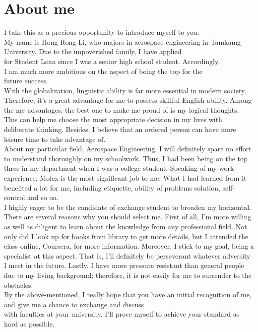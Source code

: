 \documentclass[a4paper,12pt,final]{memoir}
\begin{document}
\clearpage
\framebreak
\framebreak

\section{About me}
\raggedright
\hspace*{5mm}I take this as a precious opportunity to introduce myself to you.\\My name is Hong Rong Li, who majors in aerospace engineering in Tamkamg University. Due to the impoverished family, I have applied\\for Student Loan since I was a senior high school student. Accordingly,\\I am much more ambitious on the aspect of being the top for the\\future success.
\\
\hspace*{5mm}With the globalization, linguistic ability is far more essential in modern society. Therefore, it’s a great advantage for me to possess skillful English ability. Among the my advantages, the best one to make me proud of is my logical thoughts. This can help me choose the most appropriate decision in my lives with deliberate thinking. Besides, I believe that an ordered person can have more leisure time to take advantage of.
\\
\hspace*{5mm}About my particular field, Aerospace Engineering. I will definitely spare no effort to understand thoroughly on my schoolwork. Thus, I had been being on the top three in my department when I was a college student. Speaking of my work experience, Molex is the most significant job to me. What I had learned from it benefited a lot for me, including etiquette, ability of problems solution, self-control and so on.
\\
\hspace*{5mm}I highly eager to be the candidate of exchange student to broaden my horizontal. There are several reasons why you should select me. First of all, I’m more willing as well as diligent to learn about the knowledge from any professional field. Not only did I look up for books from library to get more details, but I attended the class online, Coursera, for more information. Moreover, I stick to my goal, being a specialist at this aspect. That is, I’ll definitely be perseverant whatever adversity I meet in the future. Lastly, I have more pressure resistant than general people due to my living background; therefore, it is not easily for me to surrender to the obstacles.
\\
\hspace*{5mm}By the above-mentioned, I really hope that you have an initial recognition of me, and give me a chance to exchange and discuss\\with faculties at your university. I’ll prove myself to achieve your standard as hard as possible.
\newpage
\framebreak
\framebreak
\end{document}
